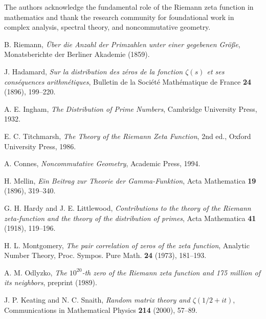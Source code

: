 \documentclass[12pt]{article}
\theoremstyle{plain}
\theoremstyle{definition}
\begin{document}
The authors acknowledge the fundamental role of the Riemann zeta function in mathematics and thank the research community for foundational work in complex analysis, spectral theory, and noncommutative geometry.

\begin{thebibliography}{99}

B. Riemann, \textit{Über die Anzahl der Primzahlen unter einer gegebenen Größe}, Monatsberichte der Berliner Akademie (1859).

J. Hadamard, \textit{Sur la distribution des zéros de la fonction $\zeta(s)$ et ses conséquences arithmétiques}, Bulletin de la Société Mathématique de France \textbf{24} (1896), 199--220.

A. E. Ingham, \textit{The Distribution of Prime Numbers}, Cambridge University Press, 1932.

E. C. Titchmarsh, \textit{The Theory of the Riemann Zeta Function}, 2nd ed., Oxford University Press, 1986.

A. Connes, \textit{Noncommutative Geometry}, Academic Press, 1994.

H. Mellin, \textit{Ein Beitrag zur Theorie der Gamma-Funktion}, Acta Mathematica \textbf{19} (1896), 319--340.

G. H. Hardy and J. E. Littlewood, \textit{Contributions to the theory of the Riemann zeta-function and the theory of the distribution of primes}, Acta Mathematica \textbf{41} (1918), 119--196.

H. L. Montgomery, \textit{The pair correlation of zeros of the zeta function}, Analytic Number Theory, Proc. Sympos. Pure Math. \textbf{24} (1973), 181--193.

A. M. Odlyzko, \textit{The $10^{20}$-th zero of the Riemann zeta function and 175 million of its neighbors}, preprint (1989).

J. P. Keating and N. C. Snaith, \textit{Random matrix theory and $\zeta(1/2+it)$}, Communications in Mathematical Physics \textbf{214} (2000), 57--89.

\end{thebibliography}
\end{document}
